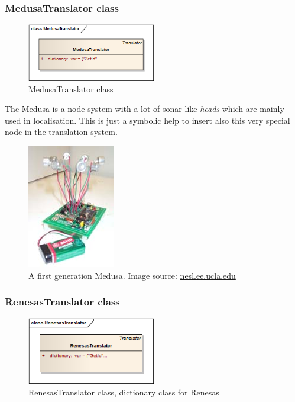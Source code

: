 \subsubsection{MedusaTranslator class}
\begin{figure}[H]
   \centering
   \includegraphics[width=0.5\textwidth]{pic/MedusaTranslator.png}%
   \caption{MedusaTranslator class}
   \label{MedusaTranslatorpic}%
\end{figure}

The Medusa is a node system with a lot of sonar-like \textit{heads} which are mainly used in localisation.\cite{Dispert}
This is just a symbolic help to insert also this very special node in the translation system.

\begin{figure}[H]
   \centering
   \includegraphics{pic/medusa.jpg}%
   \caption{A first generation Medusa. Image source: \url{nesl.ee.ucla.edu}}
   \label{Medusapic}%
\end{figure}


\subsubsection{RenesasTranslator class}
\begin{figure}[H]
   \centering
   \includegraphics[width=0.5\textwidth]{pic/RenesasTranslator.png}%
   \caption{RenesasTranslator class, dictionary class for Renesas}
   \label{RenesasTranslatorpic}%
\end{figure}

